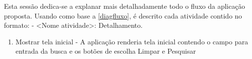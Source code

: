 Esta sessão dedica-se a explanar mais detalhadamente todo o fluxo da aplicação proposta. Usando como base a \autoref{diagfluxo}, é descrito cada atividade contido no formato: - <Nome atividade>: Detalhamento.

\begin{enumerate}
	\item Mostrar tela inicial - A aplicação renderia tela inicial contendo o campo para entrada da busca e os botões de escolha Limpar e Pesquisar
\end{enumerate}
